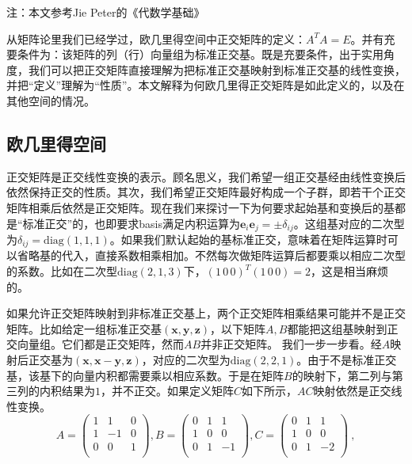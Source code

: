 

注：本文参考Jie Peter的《代数学基础》

从矩阵论里我们已经学过，欧几里得空间中正交矩阵的定义：$A^T A=E$。并有充要条件为：该矩阵的列（行）向量组为标准正交基。既是充要条件，出于实用角度，我们可以把正交矩阵直接理解为把标准正交基映射到标准正交基的线性变换，并把“定义”理解为“性质”。本文解释为何欧几里得正交矩阵是如此定义的，以及在其他空间的情况。
\subsection{欧几里得空间}
正交矩阵是正交线性变换的表示。顾名思义，我们希望一组正交基经由线性变换后依然保持正交的性质。其次，我们希望正交矩阵最好构成一个子群，即若干个正交矩阵相乘后依然是正交矩阵。现在我们来探讨一下为何要求起始基和变换后的基都是“标准正交”的，也即要求basis满足内积运算为$\boldsymbol{e}_i\boldsymbol{e}_j=\pm\delta_{ij}$。这组基对应的二次型为$\delta_{ij}=\mathrm {diag}(1,1,1)$。如果我们默认起始的基标准正交，意味着在矩阵运算时可以省略基的代入，直接系数相乘相加。不然每次做矩阵运算后都要乘以相应二次型的系数。比如在二次型$\mathrm {diag}(2,1,3)$下，$(1\,0\,0)^T (1\,0\,0)=2$，这是相当麻烦的。


如果允许正交矩阵映射到非标准正交基上，两个正交矩阵相乘结果可能并不是正交矩阵。比如给定一组标准正交基$(\boldsymbol x,\boldsymbol y,\boldsymbol z)$，以下矩阵$A,B$都能把这组基映射到正交向量组。它们都是正交矩阵，然而$AB$并非正交矩阵。
我们一步一步看。经$A$映射后正交基为$(\boldsymbol x,\boldsymbol{x-y},\boldsymbol z)$，对应的二次型为$\mathrm {diag}(2,2,1)$。由于不是标准正交基，该基下的向量内积都需要乘以相应系数。于是在矩阵$B$的映射下，第二列与第三列的内积结果为$1$，并不正交。如果定义矩阵$C$如下所示，$AC$映射依然是正交线性变换。
\begin{equation}
A=\begin{pmatrix}
  1&  1&  0   \\
  1&  -1&  0  \\
  0& 0 & 1   \\
\end{pmatrix},
B=\begin{pmatrix}
  0&  1&  1   \\
  1&  0&  0  \\
  0& 1 & -1   \\
\end{pmatrix},
C=\begin{pmatrix}
  0&  1&  1   \\
  1&  0&  0  \\
  0& 1 & -2   \\
\end{pmatrix}~,
\end{equation}

